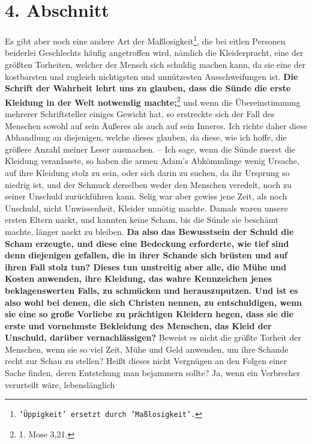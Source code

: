 \section{4. Abschnitt} \label{kap14_ab4}

Es gibt aber noch eine andere Art der Maßlosigkeit\footnote{\texttt{'Üppigkeit'
ersetzt
durch 'Maßlosigkeit'.}}, die bei eitlen Personen beiderlei
Geschlechts häufig angetroffen wird, nämlich die Kleiderpracht,
eine der
größten Torheiten, welcher der Mensch sich schuldig machen kann, da sie eine
der kostbarsten und zugleich nichtigsten und unnützesten Ausschweifungen ist.
\textbf{Die
Schrift der Wahrheit lehrt uns zu glauben, dass die Sünde die erste Kleidung in
der
Welt notwendig machte;}\footnote{1. Mose 3,21.}
und wenn die Übereinstimmung
mehrerer Schriftsteller einiges Gewicht hat, so erstreckte sich der Fall des
Menschen sowohl auf sein Äußeres als auch auf sein Inneres. Ich richte daher
diese
Abhandlung an diejenigen, welche dieses glauben, da diese, wie ich hoffe, die
größere Anzahl meiner Leser ausmachen. -- Ich sage, wenn die Sünde zuerst die
Kleidung veranlasste, so haben die armen Adam’s
Abkömmlinge wenig Ursache, auf
ihre Kleidung stolz zu sein, oder sich darin zu suchen, da ihr Ursprung so
niedrig ist, und der Schmuck derselben weder den Menschen veredelt, noch zu
seiner Unschuld zurückführen kann. Selig war aber gewiss jene Zeit, als noch
Unschuld, nicht Unwissenheit, Kleider unnötig machte. Damals waren unsere ersten
Eltern nackt, und kannten keine Scham, bis die Sünde sie beschämt
machte,
länger nackt zu bleiben. \label{ref:14_04_wahre_nachfolger_kleidung}
\textbf{Da also das Bewusstsein der Schuld die Scham erzeugte,
und diese eine Bedeckung erforderte, wie tief sind denn diejenigen gefallen, die
in ihrer Schande sich brüsten und auf ihren Fall stolz tun? Dieses tun
unstreitig aber alle, die Mühe und Kosten anwenden, ihre Kleidung, das wahre
Kennzeichen jenes beklagenswerten Falls, zu schmücken und herauszuputzen. Und
ist es also wohl bei denen, die sich Christen nennen, zu entschuldigen, wenn sie
eine so große Vorliebe zu prächtigen Kleidern hegen, dass sie die erste und
vornehmste Bekleidung des Menschen, das Kleid der Unschuld, darüber
vernachlässigen?} Beweist es nicht die größte Torheit der Menschen, wenn sie so
viel Zeit, Mühe und Geld anwenden, um ihre Schande recht zur Schau zu stellen?
Heißt dieses nicht Vergnügen an den Folgen einer Sache finden, deren Entstehung
man bejammern sollte? Ja, wenn ein Verbrecher verurteilt wäre, lebenslänglich
